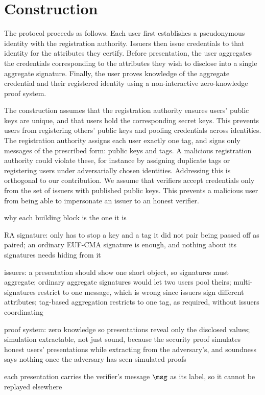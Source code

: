 \section{Construction}\label{sec:agg-creds-construction}

The protocol proceeds as follows. Each user first establishes a
pseudonymous identity with the registration authority. Issuers then issue
credentials to that identity for the attributes they certify. Before
presentation, the user aggregates the credentials corresponding to the
attributes they wish to disclose into a single aggregate signature. Finally, the
user proves knowledge of the aggregate credential and their registered identity
using a non-interactive zero-knowledge proof system.

The construction assumes that the registration authority ensures users' public
keys are unique, and that users hold the corresponding secret keys.
This prevents users from registering others' public keys and pooling credentials
across identities.  The registration authority assigns each user exactly one
tag, and signs only messages of the prescribed form: public keys and tags. A
malicious registration authority could violate these, for instance by assigning
duplicate tags or registering users under adversarially chosen identities.
Addressing this is orthogonal to our contribution.  We assume that verifiers
accept credentials only from the set of issuers with published public keys. This
prevents a malicious user from being able to impersonate an issuer to an honest
verifier.

\begin{outline}
  \item why each building block is the one it is
  \item RA signature: only has to stop a key and a tag it did not pair being passed off as paired; an ordinary EUF-CMA signature is enough, and nothing about its signatures needs hiding from it
  \item issuers: a presentation should show one short object, so signatures must aggregate; ordinary aggregate signatures would let two users pool theirs; multi-signatures restrict to one message, which is wrong since issuers sign different attributes; tag-based aggregation restricts to one tag, as required, without issuers coordinating
  \item proof system: zero knowledge so presentations reveal only the disclosed values; simulation extractable, not just sound, because the security proof simulates honest users' presentations while extracting from the adversary's, and soundness says nothing once the adversary has seen simulated proofs
  \item each presentation carries the verifier's message $\msg$ as its label, so it cannot be replayed elsewhere
\end{outline}

